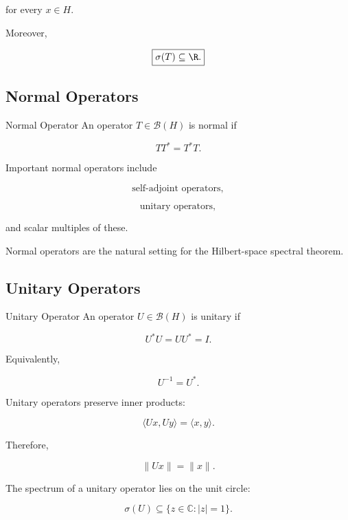 for every \(x\in H\).

Moreover,

\[
\boxed{
\sigma(T)\subseteq\R.
}
\]

\subsection{Normal Operators}
\label{subsec:normal-operators}

\begin{definitionbox}{Normal Operator}
An operator \(T\in\mathcal{B}(H)\) is normal if

\[
\boxed{
TT^*=T^*T.
}
\]
\end{definitionbox}

Important normal operators include

\[
\boxed{
\text{self-adjoint operators},
}
\]

\[
\boxed{
\text{unitary operators},
}
\]

and scalar multiples of these.

Normal operators are the natural setting for the Hilbert-space spectral
theorem.

\subsection{Unitary Operators}
\label{subsec:unitary-operators}

\begin{definitionbox}{Unitary Operator}
An operator \(U\in\mathcal{B}(H)\) is unitary if

\[
\boxed{
U^*U
=
UU^*
=
I.
}
\]
\end{definitionbox}

Equivalently,

\[
\boxed{
U^{-1}=U^*.
}
\]

Unitary operators preserve inner products:

\[
\boxed{
\langle Ux,Uy\rangle
=
\langle x,y\rangle.
}
\]

Therefore,

\[
\boxed{
\|Ux\|=\|x\|.
}
\]

The spectrum of a unitary operator lies on the unit circle:

\[
\boxed{
\sigma(U)
\subseteq
\{
z\in\mathbb{C}:|z|=1
\}.
}
\]

